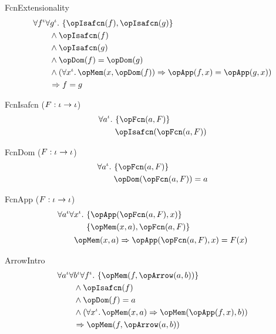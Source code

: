 \documentclass[11pt, a4paper, oneside]{article}
\begin{document}
\begin{axioms}
\item[FcnExtensionality] \[
        \begin{aligned}
            &\forall f^\idv \forall g^\idv.\, \st{ \opIsafcn(f), \opIsafcn(g) } \\
            &\qquad \wedge \opIsafcn(f) \\
            &\qquad \wedge \opIsafcn(g) \\
            &\qquad \wedge \opDom(f) = \opDom(g) \\
            &\qquad \wedge (\forall x^\idv.\, \opMem(x, \opDom(f)) \imp \opApp(f, x) = \opApp(g, x)) \\
            &\qquad \imp f = g
        \end{aligned}
    \]

\item[FcnIsafcn ($F : \iota \rightarrow \iota$)] \[
        \begin{aligned}
            &\forall a^\idv.\, \st{ \opFcn(a, F) } \\
            &\qquad \opIsafcn(\opFcn(a, F))
        \end{aligned}
    \]

\item[FcnDom ($F : \iota \rightarrow \iota$)] \[
        \begin{aligned}
            &\forall a^\idv.\, \st{ \opFcn(a, F) } \\
            &\qquad \opDom(\opFcn(a, F)) = a
        \end{aligned}
    \]

\item[FcnApp ($F : \iota \rightarrow \iota$)] \[
        \begin{aligned}
            &\forall a^\idv \forall x^\idv.\, \begin{aligned}[t]
                &\st{ \opApp(\opFcn(a, F), x) } \\
                &\st{ \opMem(x, a), \opFcn(a, F) }
            \end{aligned} \\
            &\qquad \opMem(x, a) \imp \opApp(\opFcn(a, F), x) = F(x)
        \end{aligned}
    \]

\item[ArrowIntro] \[
        \begin{aligned}
            &\forall a^\idv \forall b^\idv \forall f^\idv.\, \st{ \opMem(f, \opArrow(a, b)) } \\
            &\qquad \wedge \opIsafcn(f) \\
            &\qquad \wedge \opDom(f) = a \\
            &\qquad \wedge (\forall x^\idv.\, \opMem(x, a) \imp \opMem(\opApp(f, x), b)) \\
            &\qquad \imp \opMem(f, \opArrow(a, b))
        \end{aligned}
    \]


\end{axioms}
\end{document}
